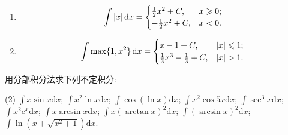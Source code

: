 \begin{solution}
    \begin{enumerate}
        \item $$\int |x| \operatorname{d\!} x = \begin{cases}
                      \frac{1}{2} x^2 + C,  & x \geqslant 0; \\
                      -\frac{1}{2} x^2 + C, & x < 0.
                  \end{cases}$$
        \item $$\int \max\{1, x^2\} \operatorname{d\!} x = \begin{cases}
                      x - 1 + C ,                        & |x| \leqslant 1; \\
                      \frac{1}{3} x^3 - \frac{1}{3} + C, & |x| > 1.
                  \end{cases}$$
    \end{enumerate}
\end{solution}

\begin{exercise}[4.1.5]
    用分部积分法求下列不定积分:
    \begin{tasks}(2)
        \task $\displaystyle \int x \sin x \mathrm{d}x$;
        \task $\displaystyle \int x^2 \ln x \mathrm{d}x$;
        \task $\displaystyle \int \cos(\ln x) \mathrm{d}x$;
        \task $\displaystyle \int x^2 \cos 5x \mathrm{d}x$;
        \task $\displaystyle \int \sec^3 x \mathrm{d}x$;
        \task $\displaystyle \int x^2 \mathrm{e}^x \mathrm{d}x$;
        \task $\displaystyle \int x \arcsin x \mathrm{d}x$;
        \task $\displaystyle \int x (\arctan x)^2 \mathrm{d}x$;
        \task $\displaystyle \int (\arcsin x)^2 \mathrm{d}x$;
        \task $\displaystyle \int \ln(x + \sqrt{x^2 + 1}) \mathrm{d}x$.
    \end{tasks}
\end{exercise}

